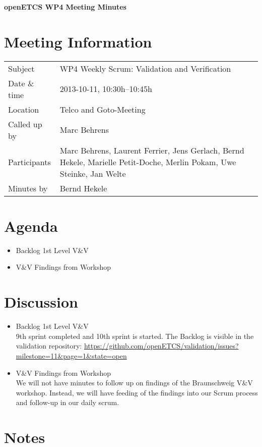 \documentclass[a4paper, 11pt]{article}
\begin{document}
{\begin{center}\huge\bf openETCS WP4 Meeting Minutes\end{center}}
\section{Meeting Information}

\renewcommand{\arraystretch}{1.5}
\begin{supertabular}{m{.2\textwidth}m{.8\textwidth}}
Subject & WP4 Weekly Scrum: Validation and Verification\\
Date \& time & 2013-10-11, 10:30h--10:45h\\
Location & Telco and Goto-Meeting\\
Called up by & Marc Behrens\\
Participants &
Marc Behrens,
Laurent Ferrier,
Jens Gerlach,
Bernd Hekele,
Marielle Petit-Doche,
Merlin Pokam,
Uwe Steinke,
Jan Welte
\\

Minutes by & Bernd Hekele\\

\end{supertabular}
\renewcommand{\arraystretch}{1.0}


\section{{Agenda}}
\begin{itemize}
\item Backlog 1st Level V\&V
\item V\&V Findings from Workshop
\end{itemize}

\section{Discussion}

\begin{itemize}
\item Backlog 1st Level V\&V\\
9th sprint completed and 10th sprint is started. 
The Backlog is visible in the validation repository:
\url{https://github.com/openETCS/validation/issues?milestone=11&page=1&state=open}\\

\item V\&V Findings from Workshop\\
We will not have minutes to follow up on findings of the Braunschweig V\&V workshop. Instead, we will have feeding of the findings into our Scrum process and follow-up in our daily scrum.

\end{itemize}


\section{Notes}
\end{document}
